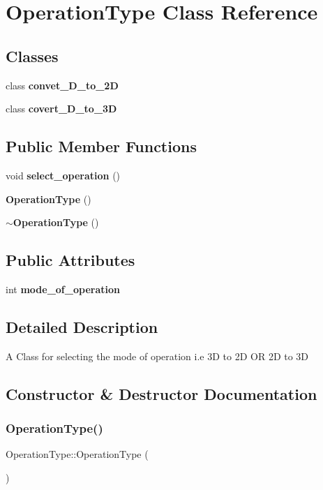 \section{Operation\+Type Class Reference}
\label{class_operation_type}
\subsection*{Classes}
\begin{DoxyCompactItemize}
\item 
class \textbf{ convet\+\_\+D\+\_\+to\+\_\+2D}
\item 
class \textbf{ covert\+\_\+D\+\_\+to\+\_\+3D}
\end{DoxyCompactItemize}
\subsection*{Public Member Functions}
\begin{DoxyCompactItemize}
\item 
void \textbf{ select\+\_\+operation} ()
\item 
\textbf{ Operation\+Type} ()
\item 
\textbf{ $\sim$\+Operation\+Type} ()
\end{DoxyCompactItemize}
\subsection*{Public Attributes}
\begin{DoxyCompactItemize}
\item 
int \textbf{ mode\+\_\+of\+\_\+operation}
\end{DoxyCompactItemize}


\subsection{Detailed Description}
A Class for selecting the mode of operation i.\+e 3D to 2D OR 2D to 3D 

\subsection{Constructor \& Destructor Documentation}
\mbox{\label{class_operation_type_a2dbae5554f3c8b4c5917e0b5534e3f4e}} 
\subsubsection{Operation\+Type()}
{\footnotesize\ttfamily Operation\+Type\+::\+Operation\+Type (\begin{DoxyParamCaption}{ }\end{DoxyParamCaption})}


